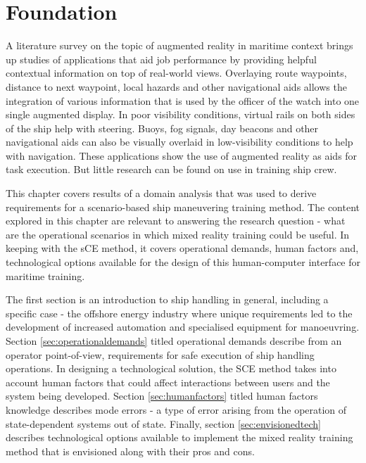 \chapter{Foundation}

A literature survey on the topic of augmented reality in maritime context brings up studies of applications that aid job performance by providing helpful contextual information on top of real-world views. Overlaying route waypoints, distance to next waypoint, local hazards and other navigational aids allows the integration of various information that is used by the officer of the watch into one single augmented display. In poor visibility conditions, virtual rails on both sides of the ship help with steering. Buoys, fog signals, day beacons and other navigational aids can also be visually overlaid in low-visibility conditions to help with navigation. These applications show the use of augmented reality as aids for task execution. But little research can be found on use in training ship crew.

This chapter covers results of a domain analysis that was used to derive requirements for a scenario-based ship maneuvering training method. The content explored in this chapter are relevant to answering the research question - what are the operational scenarios in which mixed reality training could be useful. In keeping with the sCE method, it covers operational demands, human factors and, technological options available for the design of this human-computer interface for maritime training. 

The first section is an introduction to ship handling in general, including a specific case - the offshore energy industry where unique requirements led to the development of increased automation and specialised equipment for manoeuvring. Section \ref{sec:operationaldemands} titled operational demands describe from an operator point-of-view, requirements for safe execution of ship handling operations. In designing a technological solution, the SCE method takes into account human factors that could affect interactions between users and the system being developed. Section \ref{sec:humanfactors} titled human factors knowledge describes mode errors - a type of error arising from the operation of state-dependent systems out of state. Finally, section \ref{sec:envisionedtech} describes technological options available to implement the mixed reality training method that is envisioned along with their pros and cons.



